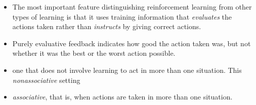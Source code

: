 \documentclass{article}
\begin{document}
\maketitle

\begin{itemize}
    \item The most important feature distinguishing reinforcement learning from other types of learning is that it uses training information that \emph{evaluates} the actions taken rather than \emph{instructs} by giving correct actions.
    \item Purely evaluative feedback indicates how good the action taken was, but not whether it was the best or the worst action possible.
    \item one that does not involve learning to act in more than one situation. This \emph{nonassociative} setting
    \item \emph{associative}, that is, when actions are taken in more than one situation.
\end{itemize}
\end{document}
